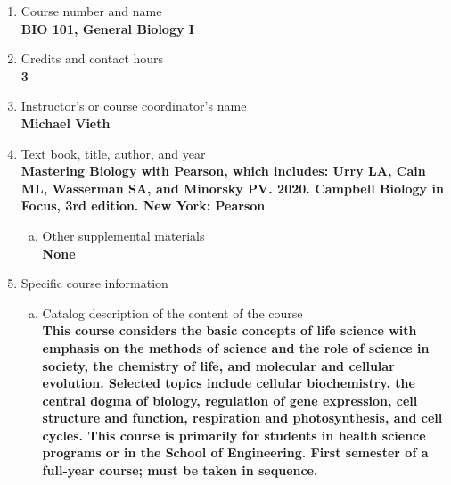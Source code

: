 \label{BIO101}  %
\begin{enumerate}[1.]
\item Course number and name\\
  {\bfseries
    BIO 101, General Biology I
  }

\item Credits and contact hours\\
  {\bfseries
    3
  }

\item Instructor's or course coordinator's name\\
  {\bfseries
    Michael Vieth
  }

\item Text book, title, author, and year\\
  {\bfseries
    Mastering Biology with Pearson, which includes: Urry LA, Cain ML, Wasserman SA, and Minorsky PV. 2020. Campbell Biology in Focus, 3rd edition. New York: Pearson
  }
\begin{enumerate}[a.]
\item Other supplemental materials\\
  {\bfseries
    None
  }
\end{enumerate}

\item Specific course information
\begin{enumerate}[a.]
\item Catalog description of the content of the course\\
  {\bfseries
This course considers the basic concepts of life science with emphasis on the methods of science and the role of science in society, the chemistry of life, and molecular and cellular evolution. Selected topics include cellular biochemistry, the central dogma of biology, regulation of gene expression, cell structure and function, respiration and photosynthesis, and cell cycles. This course is primarily for students in health science programs or in the School of Engineering. First semester of a full-year course; must be taken in sequence.
  }


\end{enumerate}
\end{enumerate}
